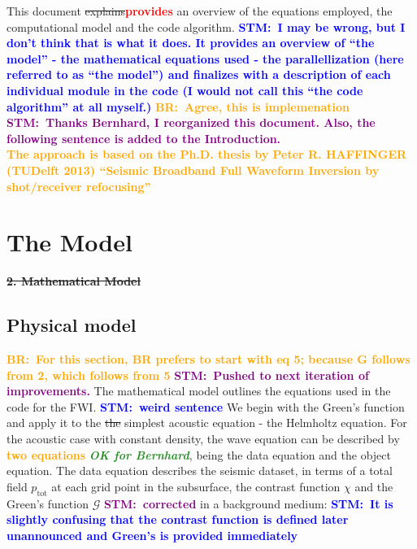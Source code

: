 \documentclass[10pt,a4paper]{article}
\newcommand{\commentstm}[1]{\textcolor{blue}{\textbf{STM:\ #1}}}
\newcommand{\commentstmtwo}[1]{\textcolor{purple}{\textbf{STM:\ #1}}}
\newcommand{\newstm}[1]{\textcolor{red}{\textbf{#1}}}
\newcommand{\newstmtwo}[1]{\textcolor{orange}{\textbf{#1}}}
\newcommand{\oldstm}[1]{\sout{#1}}
\newcommand{\brok}{\textcolor{ForestGreen}{\textit{\textbf{OK for Bernhard}}}}
\newcommand{\commentbr}[1]{\textcolor{orange}{\textbf{BR:\ #1}}}
\begin{document}

This document \oldstm{explains}\newstm{provides} an overview of the
equations employed, the computational model and the code algorithm.
\commentstm{I may be wrong, but I don't think that is what it does. It
provides an overview of ``the model'' - the mathematical equations
used - the parallellization (here referred to as ``the model'') and
finalizes with a description of each individual module in the code (I
would not call this ``the code algorithm'' at all myself.)}
\commentbr{Agree, this is implemenation}
\commentstmtwo{Thanks Bernhard, I reorganized this document. Also, the following sentence is added to the Introduction.}\\
\newstmtwo{The approach is based on the Ph.D. thesis by Peter R. HAFFINGER (TUDelft 2013) ``Seismic Broadband Full Waveform Inversion
by shot/receiver refocusing''}
\section{The Model}
\sout{\textbf{2. Mathematical Model}}\\
\subsection{Physical model}
\commentbr{For this section, BR prefers to start with eq 5; because G
follows from 2, which follows from 5}
\commentstmtwo{Pushed to next iteration of improvements.}
The mathematical model outlines the equations used in the code for the FWI.
\commentstm{weird sentence}
We begin with the Green's function and apply it to the \oldstm{the}
simplest acoustic equation - the Helmholtz equation.
For the acoustic case with constant density, the wave equation can be
described by \newstmtwo{two equations} {\brok},
being the data equation and the object equation. The data equation
describes the seismic dataset, in terms of a total field
$p_{\text{tot}}$ at each grid point in the subsurface, the contrast
function $\chi$ and the Green's function $\mathcal{G}$
\commentstmtwo{corrected} in a background medium: \commentstm{It is
slightly confusing that the contrast function is defined later
unannounced and Green's is provided immediately}
\end{document}

